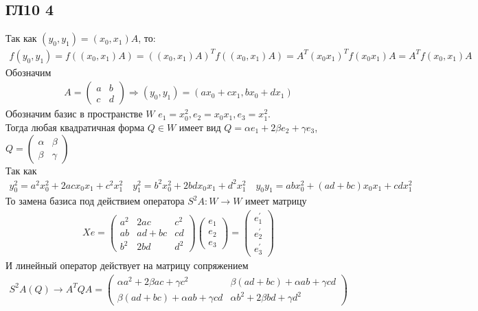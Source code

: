 \subsection*{ГЛ10 4}
Так как $\left(y_{0}, y_{1}\right) = \left(x_{0}, x_{1}\right)A$, то:
\begin{gather*}
	f(y_0,y_1) = f((x_0, x_1)A) = ((x_0, x_1)A)^Tf((x_0, x_1)A) = A^T (x_0 x_1)^T f (x_0 x_1) A = A^T f(x_0, x_1) A	
\end{gather*}
Обозначим
\begin{gather*}
	A = 
	\begin{pmatrix}
		a & b \\
		c & d
	\end{pmatrix}
	\Rightarrow 
	(y_0, y_1) = (ax_0+cx_1, bx_0+dx_1)
\end{gather*}
Обозначим базис в пространстве $W$ $e_1 = x_{0}^{2}, e_2 = x_{0} x_{1}, e_3 = x_{1}^{2}$.\\
Тогда любая квадратичная форма $Q \in W$ имеет вид $Q = \alpha e_1+2\beta e_2+\gamma e_3$, 
$Q = 
\begin{pmatrix}
	\alpha & \beta \\
	\beta & \gamma
\end{pmatrix}$\\
Так как 
\begin{gather*}
	y_0^2 = a^2x_0^2 + 2ac x_0 x_1 + c^2 x_1^2\quad y_1^2 = b^2x_0^2 + 2bd x_0 x_1 + d^2 x_1^2\quad y_0y_1 = ab x_0^2 + (ad+bc)x_0x_1 + cdx_1^2
\end{gather*}
То замена базиса под действием оператора $S^2A: W \rightarrow W$ имеет матрицу
\begin{gather*}
	Xe = 
	\begin{pmatrix}
		a^2 & 2ac & c^2 \\ 
		ab & ad+bc & cd \\
		b^2 & 2bd & d^2
	\end{pmatrix}
	\begin{pmatrix}
		e_1\\ e_2\\ e_3 
	\end{pmatrix}
	 = 
	\begin{pmatrix}
		e_1^{'} \\
		e_2^{'} \\
		e_3^{'}
	\end{pmatrix}
\end{gather*}
И линейный оператор действует на матрицу сопряжением
\begin{gather*}
	S^2A(Q) \rightarrow A^{T}QA = 
	\begin{pmatrix}
		\alpha a^2 + 2\beta ac + \gamma c^2 & \beta(ad+bc)+\alpha ab + \gamma cd\\
		\beta(ad+bc)+\alpha ab + \gamma cd & \alpha b^2 + 2\beta bd + \gamma d^2
	\end{pmatrix}
\end{gather*}
